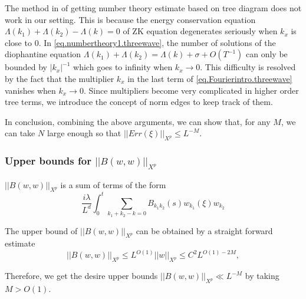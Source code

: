 The method in \cite{deng2021derivation} of getting number theory estimate based on tree diagram does not work in our setting. This is because the energy conservation equation $\Lambda(k_1)+\Lambda(k_2)-\Lambda(k)=0$ of ZK equation degenerates seriously when $k_{x}$ is close to $0$. In \eqref{eq.numbertheory1.threewave}, the number of solutions of the diophantine equation $\Lambda(k_1)+\Lambda(k_2)=\Lambda(k)+\sigma+O(T^{-1})$ can only be bounded by $|k_x|^{-1}$ which goes to infinity when $k_{x}\rightarrow 0$. This difficulty is resolved by the fact that the multiplier $k_x$ in the last term of \eqref{eq.Fourierintro.threewave} vanishes when $k_{x}\rightarrow 0$. Since multipliers become very complicated in higher order tree terms, we introduce the concept of norm edges to keep track of them. 

In conclusion, combining the above arguments, we can show that, for any $M$, we can take $N$ large enough so that $||Err(\xi)||_{X^p}\le L^{-M}$.





\subsubsection{Upper bounds for $||B(w,w)||_{X^p}$} $||B(w,w)||_{X^p}$ is a sum of terms of the form
\begin{equation}
    \frac{i\lambda}{L^{d}} \int^{t}_0\sum_{k_1+k_2-k=0} B_{k_1k_2}(s)  w_{k_1}(\xi)w_{k_2}
\end{equation}

The upper bound of $||B(w,w)||_{X^p}$ can be obtained by a straight forward estimate
\begin{equation}
||B(w,w)||_{X^p}\le L^{O(1)} ||w||_{X^p} \le C^2 L^{O(1)-2M},
\end{equation}

Therefore, we get the desire upper bounds $||B(w,w)||_{X^p}\ll L^{-M}$ by taking $M> O(1)$.

